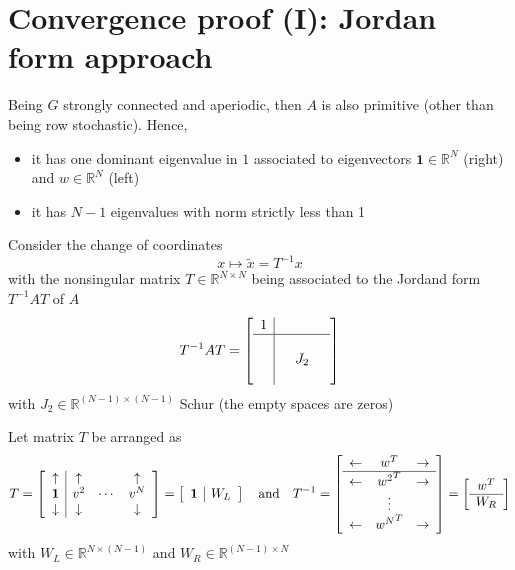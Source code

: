 \documentclass{book}
\newcommand{\R}{\mathbb{R}}
\theoremstyle{theoremv2}
\theoremstyle{defv2}
\theoremstyle{remark}
\theoremstyle{remark}
\theoremstyle{definition}
\theoremstyle{definition}
\begin{document}
\section{Convergence proof (I): Jordan form approach}
Being $G$ strongly connected and aperiodic, then $A$ is also primitive (other than being row stochastic). Hence, 
\begin{itemize}
    \item it has one dominant eigenvalue in $1$ associated to eigenvectors $\boldsymbol{1}\in\R^N$ (right) and $w\in\R^N$ (left)
    \item it has $N-1$ eigenvalues with norm strictly less than 1
\end{itemize}
Consider the change of coordinates 
\[
    x \longmapsto \tilde{x} = T^{-1}x
\]
with the nonsingular matrix $T\in\R^{N\times N}$ being associated to the Jordand form $T^{-1}AT$ of $A$
\[
    T^{-1} A T = \left[\begin{array}{c| c c c }
        1 & & & \\ \hline \\ & & J_2 & \\ & & & 
    \end{array}\right]
\]
with $J_2\in\R^{(N-1) \times (N-1)}$ Schur (the empty spaces are zeros)

Let matrix $T$ be arranged as 
\[
    T = \left[\begin{array}{c | c c c}
        \uparrow & \uparrow & & \uparrow\\ 
        \boldsymbol{1} & v^2 & \cdots & v^N \\
        \downarrow & \downarrow & & \downarrow
    \end{array}\right] = \left[\begin{array}{c | c}
        \boldsymbol{1} & W_L
    \end{array}\right] \quad \text{and} \quad T^{-1} = \left[\begin{array}{c c c}
        \leftarrow &  w^T   &\rightarrow \\ \hline
        \leftarrow &  {w^2}^T   &\rightarrow \\
         &  \vdots   &\\
        \leftarrow &  {w^N}^T   &\rightarrow \\
    \end{array}\right] = \left[\begin{array}{c}
        w^T \\ \hline
        W_R
    \end{array} \right]
\]
with $W_L\in\R^{N\times (N-1)}$ and $W_R\in\R^{(N-1)\times N}$
\end{document}
